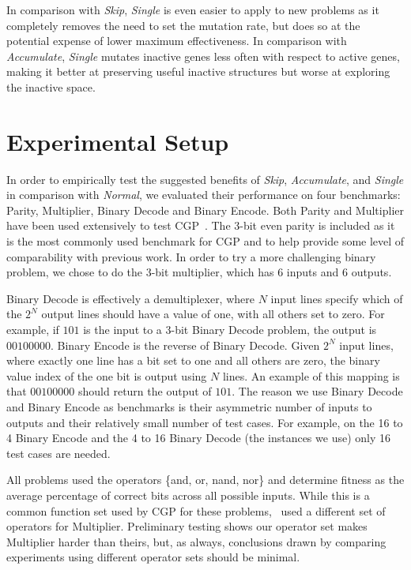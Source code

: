 \documentclass[runningheads,a4paper]{llncs}
\begin{document}
In comparison with \emph{Skip}, \emph{Single} is even easier to apply to new problems
as it completely removes the need to set the mutation rate, but does so at the
potential expense of lower maximum effectiveness.  In comparison with \emph{Accumulate},
\emph{Single} mutates inactive genes less often with respect to active genes, making it
better at preserving useful inactive structures but worse at exploring the inactive
space.

\section{Experimental Setup}
In order to empirically test the suggested benefits of \emph{Skip},
\emph{Accumulate}, and \emph{Single} in comparison with \emph{Normal}, we evaluated their performance on
four benchmarks: Parity, Multiplier, Binary Decode and Binary Encode.
Both Parity and Multiplier have been used extensively to test
CGP~\cite{walker:2008:cgpmodules,miller:2006:redundancy}.
The 3-bit even parity is included as it is the most commonly used benchmark for CGP and to
help provide some level of comparability with previous work.  In order to try a
more challenging binary problem, we chose to do the 3-bit multiplier, which has
6 inputs and 6 outputs.

Binary Decode is effectively a demultiplexer, where $N$
input lines specify which of the $2^N$ output lines should have a value of one, with
all others set to zero.  For example, if $101$ is the input to a 3-bit Binary Decode
problem, the output is $00100000$.  Binary Encode is the reverse of Binary Decode.
Given $2^N$ input lines, where exactly one line has a bit set to one and all others
are zero, the binary value index of the one bit is output using $N$ lines.
An example of this mapping is that $00100000$
should return the output of $101$.  The reason we use Binary Decode and Binary Encode
as benchmarks is their asymmetric number of inputs to outputs and their relatively
small number of test cases.  For example, on the 16 to 4 Binary Encode and the 4 to 16 Binary
Decode (the instances we use) only 16 test cases are needed.

All problems used the operators \{and, or, nand, nor\} and determine fitness as the average
percentage of correct bits across all possible inputs.  While this is a common function set used
by CGP for these problems,~\cite{walker:2008:cgpmodules} used a different set of operators
for Multiplier.  Preliminary testing shows our operator set makes Multiplier harder than theirs,
but, as always, conclusions drawn by comparing experiments using different operator sets should
be minimal.
\end{document}
